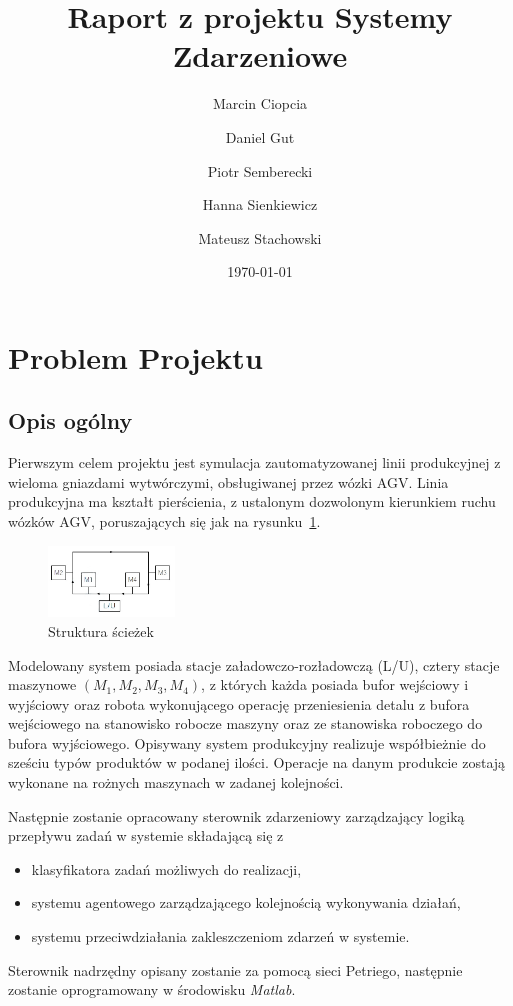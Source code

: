 \documentclass[10pt, a4paper]{article}
\author{Marcin Ciopcia \and Daniel Gut \and Piotr Semberecki \and Hanna Sienkiewicz \and Mateusz Stachowski
}
\title{Raport z projektu Systemy Zdarzeniowe}
\date{\today}
\begin{document}
\maketitle



\section{Problem Projektu}
\label{sec:wstep}
%
\subsection{Opis ogólny}
Pierwszym celem projektu jest symulacja zautomatyzowanej linii produkcyjnej z wieloma gniazdami wytwórczymi, obsługiwanej przez wózki AGV. Linia produkcyjna ma kształt pierścienia, z ustalonym dozwolonym kierunkiem ruchu wózków AGV, poruszających się jak na rysunku~\ref{fig:sch}.
 \begin{figure}[H]
  \begin{center}
    \includegraphics[width=0.3\textwidth]{./obrazki/Schemat.png}
    \caption{Struktura ścieżek}
    \label{fig:sch}
  \end{center}
 \end{figure}
Modelowany system posiada stacje załadowczo-rozładowczą (L/U), cztery stacje  maszynowe $(M_1,M_2,M_3,M_4)$, z których każda posiada bufor wejściowy i wyjściowy oraz robota wykonującego operację przeniesienia detalu z bufora wejściowego na stanowisko robocze maszyny oraz ze stanowiska roboczego do bufora wyjściowego. Opisywany system produkcyjny realizuje współbieżnie do sześciu typów produktów w podanej ilości. Operacje na danym produkcie zostają wykonane na rożnych maszynach w zadanej kolejności.
 
 
Następnie zostanie opracowany sterownik zdarzeniowy zarządzający logiką przepływu zadań w systemie składającą się z
\begin{itemize}
\item klasyfikatora zadań możliwych do realizacji,
\item systemu agentowego zarządzającego kolejnością wykonywania działań,
\item systemu przeciwdziałania zakleszczeniom zdarzeń w systemie.
\end{itemize}
Sterownik nadrzędny opisany zostanie za pomocą sieci Petriego, następnie zostanie oprogramowany w środowisku \textit{Matlab}.
\end{document}
